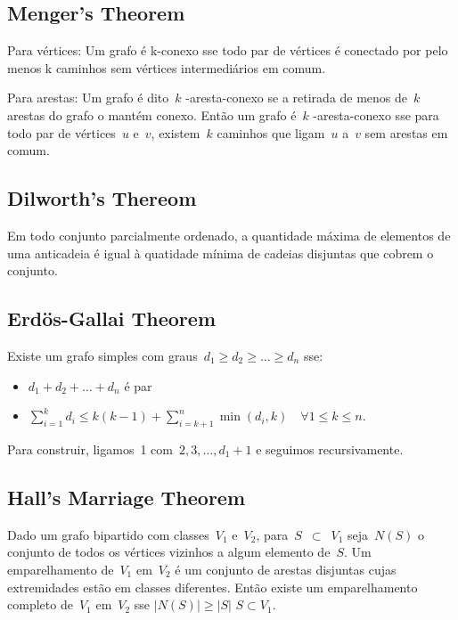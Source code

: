     \subsection{Menger's Theorem}
    \item Para vértices:
    Um grafo é k-conexo sse todo par de vértices é conectado por pelo menos k caminhos sem vértices intermediários em comum.
    \item Para arestas:
    Um grafo é dito~$k$ -aresta-conexo se a retirada de menos de~$k$ arestas do grafo o mantém conexo. Então um grafo é~$k$ -aresta-conexo sse para todo par de vértices~$u$ e~$v$, existem~$k$ caminhos que ligam~$u$ a~$v$ sem arestas em comum.



    \subsection{Dilworth's Thereom}
    Em todo conjunto parcialmente ordenado, a quantidade máxima de elementos de uma anticadeia é igual à  quatidade mínima de cadeias disjuntas que cobrem o conjunto.	
   
    \subsection{Erdös-Gallai Theorem}
            Existe um grafo simples com graus~$d_1 \geq d_2 \geq \ldots \geq d_n$ sse:
            \begin{itemize}
            \item $d_1 + d_2 + \ldots + d_n$ é par
            \item $\sum\limits_{i = 1}^k{d_i} \leq k(k-1) + \sum\limits_{i=k+1}^n{\min(d_i, k)} \quad \forall 1 \leq k \leq n$.
            \end{itemize}
            Para construir, ligamos~1 com~$2, 3, \ldots, d_1 + 1$ e seguimos recursivamente.
       
        \subsection{Hall's Marriage Theorem}
        Dado um grafo bipartido com classes~$V_1$ e~$V_2$, para~$S$~$\subset$~$V_1$ seja~$N(S)$ o conjunto de todos os vértices vizinhos a algum elemento de~$S$. Um           emparelhamento de~$V_1$ em~$V_2$ é um conjunto de arestas disjuntas cujas extremidades estão em classes diferentes. Então existe um emparelhamento completo de~$V_1$ em~$V_2$   sse $|N(S)| \geq |S|$ \forall $ S \subset V_1 $.
    
